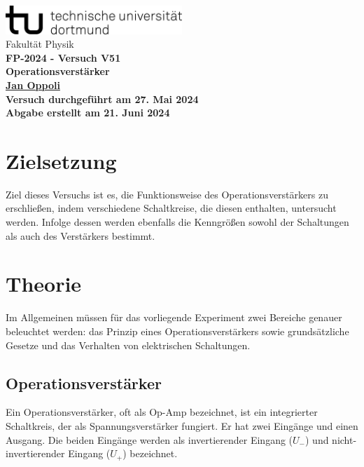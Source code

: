 \documentclass[12pt]{article}
\begin{document}
\begin{titlepage}
  \centering
  \vspace*{1cm}
  \includegraphics[width=0.5\textwidth]{Ressourcen/tud_logo_schwarz(RGB)}\\
  \vspace*{0.25cm}
  \large\textmd{Fakultät Physik} \\
  \vspace*{6cm}
  \huge \bfseries FP-2024 - Versuch V51\\
  \vspace*{0.25cm}
  \large Operationsverstärker\\
  \vspace*{0.25cm}
  \large\textmd{\href{mailto:jan.oppoli@tu-dortmund.de}{Jan Oppoli}} \\
  \vfill
  \small\textmd{Versuch durchgeführt am 27. Mai 2024}\\
  \small\textmd{Abgabe erstellt am 21. Juni 2024}
\end{titlepage}
\tableofcontents 
\newpage

\section{Zielsetzung}\label{sec:zielsetzung}
Ziel dieses Versuchs ist es, die Funktionsweise des Operationsverstärkers zu erschließen, indem verschiedene Schaltkreise, die diesen enthalten, untersucht werden. Infolge dessen werden ebenfalls die Kenngrößen sowohl der Schaltungen als auch des Verstärkers bestimmt.

\section{Theorie}\label{sec:theorie}
Im Allgemeinen müssen für das vorliegende Experiment zwei Bereiche genauer beleuchtet werden: das Prinzip eines Operationsverstärkers sowie grundsätzliche Gesetze und das Verhalten von elektrischen Schaltungen.

\subsection{Operationsverstärker}
Ein Operationsverstärker, oft als Op-Amp bezeichnet, ist ein integrierter Schaltkreis, der als Spannungsverstärker fungiert. Er hat zwei Eingänge und einen Ausgang. Die beiden Eingänge werden als invertierender Eingang (\( U_- \)) und nicht-invertierender Eingang (\( U_+ \)) bezeichnet.
\end{document}
